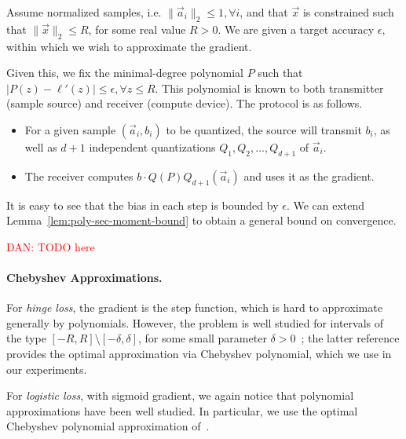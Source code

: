 Assume normalized samples, i.e. $\| \vec{a}_i \|_2 \leq 1, \forall i$, and that $\vec{x}$ is constrained such that $\| \vec{x} \|_2 \leq R$, for some real value $R > 0$. We are given a target accuracy $\epsilon$, within which we wish to approximate the gradient. 

Given this, we fix the minimal-degree polynomial $P$ such that $|P(z) - \ell'(z)| \leq \epsilon, \forall z \leq R$. This polynomial is known to both transmitter (sample source) and receiver (compute device). The protocol is as follows. 
\begin{itemize}
	\item For a given sample $(\vec{a}_i, b_i)$ to be quantized, the source will transmit $b_i$, as well as $d + 1$ independent quantizations $Q_1, Q_2, \ldots, Q_{d + 1}$ of $\vec{a}_i$. 
	\item The receiver computes $b \cdot Q(P) Q_{d + 1} ( \vec{a}_i )$ and uses it as the gradient.
\end{itemize}

It is easy to see that the bias in each step is bounded by $\epsilon$. 
We can extend Lemma~\ref{lem:poly-sec-moment-bound} to obtain a general bound on convergence. 

\begin{lemma}
	\textcolor{red}{DAN: TODO here}
\end{lemma}

\paragraph{Chebyshev Approximations.} 
For \emph{hinge loss}, the gradient is the step function, which is hard to approximate generally by polynomials. 
However, the problem is well studied for intervals of the type  $[-R, R] \setminus [-\delta, \delta]$, for some small parameter $\delta > 0$~\cite{frostig2016principal, allen2016faster}; the latter reference provides the optimal approximation via Chebyshev polynomial, which we use in our experiments. 

For \emph{logistic loss}, with sigmoid gradient, we again notice that polynomial approximations have been well studied. In particular, we use the optimal Chebyshev polynomial approximation of~\cite{vlcek2012chebyshev}. 
